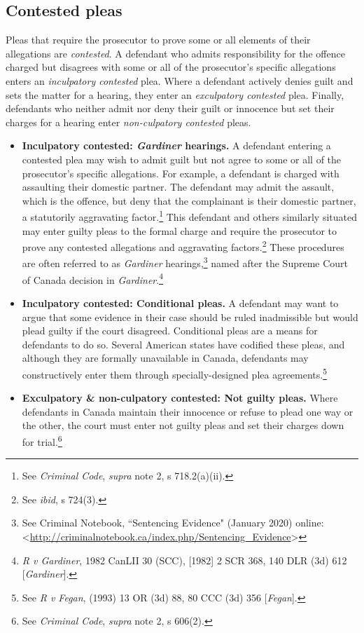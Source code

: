 \subsection{Contested pleas}

Pleas that require the prosecutor to prove some or all elements of their allegations are \textit{contested}. A defendant who admits responsibility for the offence charged but disagrees with some or all of the prosecutor's specific allegations enters an \textit{inculpatory contested} plea. Where a defendant actively denies guilt and sets the matter for a hearing, they enter an \textit{exculpatory contested} plea. Finally, defendants who neither admit nor deny their guilt or innocence but set their charges for a hearing enter \textit{non-culpatory contested} pleas.

\begin{itemize}
    \item \textbf{Inculpatory contested: \textit{Gardiner} hearings.} A defendant entering a contested plea may wish to admit guilt but not agree to some or all of the prosecutor's specific allegations. For example, a defendant is charged with assaulting their domestic partner. The defendant may admit the assault, which is the offence, but deny that the complainant is their domestic partner, a statutorily aggravating factor.\footnote{See \textit{Criminal Code}, \textit{supra} note 2, s 718.2(a)(ii).} This defendant and others similarly situated may enter guilty pleas to the formal charge and require the prosecutor to prove any contested allegations and aggravating factors.\footnote{See \textit{ibid}, s 724(3).} These procedures are often referred to as \textit{Gardiner} hearings,\footnote{See Criminal Notebook, ``Sentencing Evidence" (January 2020) online: \textless \url{http://criminalnotebook.ca/index.php/Sentencing_Evidence}\textgreater} named after the Supreme Court of Canada decision in \textit{Gardiner}.\footnote{\textit{R v Gardiner}, 1982 CanLII 30 (SCC), [1982] 2 SCR 368, 140 DLR (3d) 612 [\textit{Gardiner}].}
    
    \item \textbf{Inculpatory contested: Conditional pleas.} A defendant may want to argue that some evidence in their case should be ruled inadmissible but would plead guilty if the court disagreed. Conditional pleas are a means for defendants to do so. Several American states have codified these pleas, and although they are formally unavailable in Canada, defendants may constructively enter them through specially-designed plea agreements.\footnote{See \textit{R v Fegan}, (1993) 13 OR (3d) 88, 80 CCC (3d) 356 [\textit{Fegan}].}
    
    \item \textbf{Exculpatory \& non-culpatory contested: Not guilty pleas.} Where defendants in Canada maintain their innocence or refuse to plead one way or the other, the court must enter not guilty pleas and set their charges down for trial.\footnote{See \textit{Criminal Code}, \textit{supra} note 2, s 606(2).} 
    
\end{itemize}

